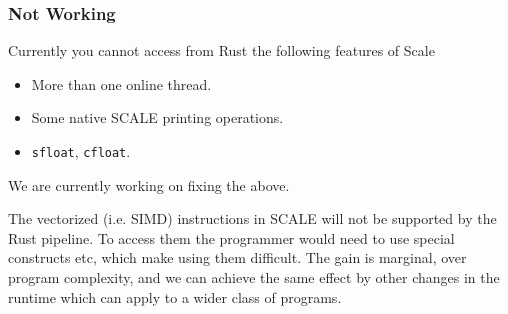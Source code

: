 \subsubsection{Not Working}
Currently you cannot access from Rust the following features of Scale
\begin{itemize}
     \item More than one online thread.
     \item Some native SCALE printing operations.
     \item \verb|sfloat|, \verb|cfloat|.
\end{itemize}
We are currently working on fixing the above.

The vectorized (i.e. SIMD) instructions in SCALE will not be
supported by the Rust pipeline. To access them the programmer
would need to use special constructs etc, which make using them
difficult. The gain is marginal, over program complexity, and we
can achieve the same effect by other changes in the runtime which
can apply to a wider class of programs.

